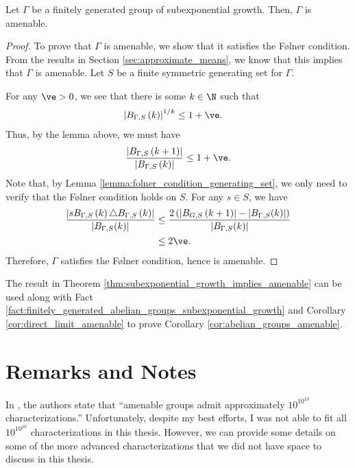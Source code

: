 \documentclass[10pt]{mypackage2}
\begin{document}
\begin{theorem}\label{thm:subexponential_growth_implies_amenable}
  Let $\Gamma$ be a finitely generated group of subexponential growth. Then, $\Gamma$ is amenable.
\end{theorem}
\begin{proof}
  To prove that $\Gamma$ is amenable, we show that it satisfies the Følner condition. From the results in Section \ref{sec:approximate_means}, we know that this implies that $\Gamma$ is amenable. Let $S$ be a finite symmetric generating set for $\Gamma$.\newline

  For any $\ve > 0$, we see that there is some $k\in \N$ such that
  \begin{align*}
    \left\vert B_{\Gamma,S}\left(k\right) \right\vert^{1/k} &\leq 1 + \ve.
  \end{align*}
  Thus, by the lemma above, we must have
  \begin{align*}
    \frac{\left\vert B_{\Gamma,S}\left(k+1\right) \right\vert}{\left\vert B_{\Gamma,S} \left(k\right)\right\vert} \leq 1 + \ve.
  \end{align*}
  Note that, by Lemma \ref{lemma:folner_condition_generating_set}, we only need to verify that the Følner condition holds on $S$. For any $s\in S$, we have
  \begin{align*}
    \frac{\left\vert sB_{\Gamma,S}\left(k\right)\triangle B_{\Gamma,S}\left(k\right) \right\vert}{\left\vert B_{\Gamma,S}(k) \right\vert} &\leq \frac{2\left(\left\vert B_{G,S}\left(k+1\right) \right\vert - \left\vert B_{\Gamma,S}(k) \right\vert\right)}{\left\vert B_{\Gamma,S}(k) \right\vert}\\
                                                                                                                    &\leq 2\ve.
  \end{align*}
  Therefore, $\Gamma$ satisfies the Følner condition, hence is amenable.
\end{proof}
\begin{remark}
  The result in Theorem \ref{thm:subexponential_growth_implies_amenable} can be used along with Fact \ref{fact:finitely_generated_abelian_groups_subexponential_growth} and Corollary \ref{cor:direct_limit_amenable} to prove Corollary \ref{cor:abelian_groups_amenable}.
\end{remark}
\section{Remarks and Notes}%
In \cite[48]{brown_and_ozawa}, the authors state that ``amenable groups admit approximately $10^{10^{10}}$ characterizations.'' Unfortunately, despite my best efforts, I was not able to fit all $10^{10^{10}}$ characterizations in this thesis. However, we can provide some details on some of the more advanced characterizations that we did not have space to discuss in this thesis.\newline
\end{document}
